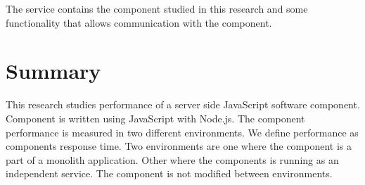 The service contains the component studied in this research and some functionality that allows communication with the component.

\section{Summary}
This research studies performance of a server side JavaScript software component.
Component is written using JavaScript with Node.js.
The component performance is measured in two different environments.
We define performance as components response time.
Two environments are one where the component is a part of a monolith application.
Other where the components is running as an independent service.
The component is not modified between environments.
